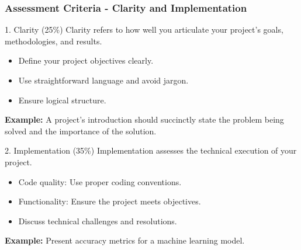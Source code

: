 \documentclass[aspectratio=169]{beamer}
\begin{document}
\begin{frame}[fragile]
    \frametitle{Assessment Criteria - Clarity and Implementation}
    \begin{block}{1. Clarity (25\%)}
        Clarity refers to how well you articulate your project's goals, methodologies, and results.
        \begin{itemize}
            \item Define your project objectives clearly.
            \item Use straightforward language and avoid jargon.
            \item Ensure logical structure.
        \end{itemize}
        \textbf{Example:} A project's introduction should succinctly state the problem being solved and the importance of the solution.
    \end{block}
    
    \begin{block}{2. Implementation (35\%)}
        Implementation assesses the technical execution of your project.
        \begin{itemize}
            \item Code quality: Use proper coding conventions.
            \item Functionality: Ensure the project meets objectives.
            \item Discuss technical challenges and resolutions.
        \end{itemize}
        \textbf{Example:} Present accuracy metrics for a machine learning model.
    \end{block}
\end{frame}
\end{document}
